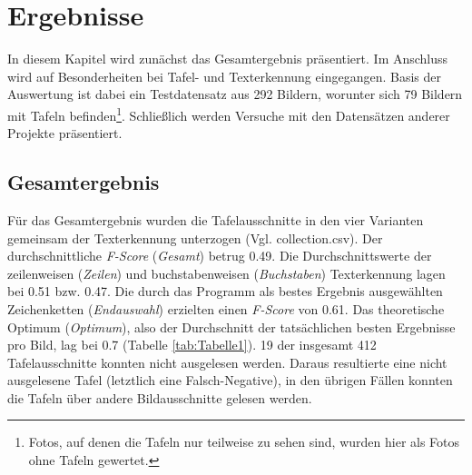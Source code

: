 \section{Ergebnisse}

In diesem Kapitel wird zunächst das Gesamtergebnis präsentiert. Im Anschluss wird auf Besonderheiten bei Tafel- und Texterkennung eingegangen. Basis der Auswertung ist dabei ein Testdatensatz aus 292 Bildern, worunter sich 79 Bildern mit Tafeln befinden\footnote{Fotos, auf denen die Tafeln nur teilweise zu sehen sind, wurden hier als Fotos ohne Tafeln gewertet.}.
Schließlich werden Versuche mit den Datensätzen anderer Projekte präsentiert.

\subsection{Gesamtergebnis}
Für das Gesamtergebnis wurden die Tafelausschnitte in den vier Varianten gemeinsam der Texterkennung unterzogen (Vgl. collection.csv). Der durchschnittliche  \textit{F-Score} (\textit{Gesamt}) betrug 0.49. Die Durchschnittswerte der zeilenweisen (\textit{Zeilen}) und buchstabenweisen (\textit{Buchstaben}) Texterkennung lagen bei 0.51 bzw. 0.47. Die durch das Programm als bestes Ergebnis ausgewählten Zeichenketten (\textit{Endauswahl}) erzielten einen \textit{F-Score} von 0.61. Das theoretische Optimum (\textit{Optimum}), also der Durchschnitt der tatsächlichen besten Ergebnisse pro Bild, lag bei 0.7 (Tabelle \ref{tab:Tabelle1}). 19 der insgesamt 412 Tafelausschnitte konnten nicht ausgelesen werden. Daraus resultierte eine nicht ausgelesene Tafel (letztlich eine Falsch-Negative), in den übrigen Fällen konnten die Tafeln über andere Bildausschnitte gelesen werden.
\\
